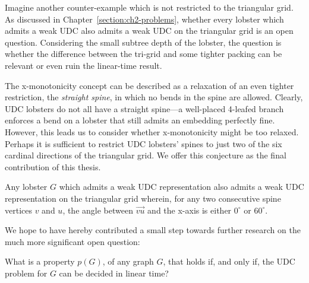 Imagine another counter-example which is not restricted to the triangular grid. As discussed in Chapter~\ref{section:ch2-problems}, whether every lobster which admits a weak UDC also
admits a weak UDC on the triangular grid is an open question. Considering the small subtree depth of the lobster, the question is whether the difference between the tri-grid and some tighter packing can be relevant or even ruin the linear-time result.

The x-monotonicity concept can be described as a relaxation of an even tighter restriction, the \emph{straight spine}, in which no bends in the spine are allowed. Clearly, UDC lobsters do not all have a straight spine---a well-placed 4-leafed branch enforces a bend on a lobster that still admits an embedding perfectly fine. However, this leads us to consider whether x-monotonicity might be too relaxed. Perhaps it is sufficient to restrict UDC lobsters' spines to just two of the six cardinal directions of the triangular grid. We offer this conjecture as the final contribution of this thesis.

\begin{conjecture}
Any lobster $G$ which admits a weak UDC representation also admits a weak UDC representation on the triangular grid wherein, for any two consecutive spine vertices $v$ and $u$, the angle between $\overrightarrow{vu}$ and the x-axis is either $0^\circ$ or $60^\circ$.
\end{conjecture}

We hope to have hereby contributed a small step towards further research on the much more significant open question:

\begin{displayquote}
What is a property $p(G)$, of any graph $G$, that holds if, and only if, the UDC problem for $G$ can be decided in linear time?
\end{displayquote}
